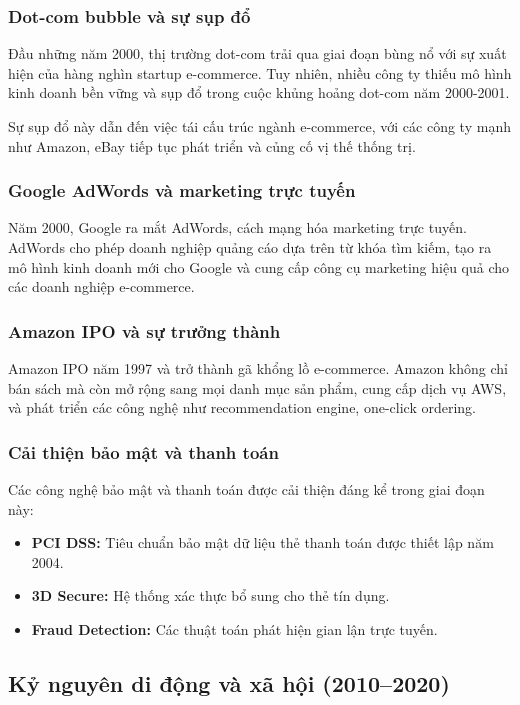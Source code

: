 \documentclass[a4paper,12pt]{report}
\begin{document}
\subsubsection{Dot-com bubble và sự sụp đổ}
Đầu những năm 2000, thị trường dot-com trải qua giai đoạn bùng nổ với sự xuất hiện của hàng nghìn startup e-commerce. Tuy nhiên, nhiều công ty thiếu mô hình kinh doanh bền vững và sụp đổ trong cuộc khủng hoảng dot-com năm 2000-2001.

Sự sụp đổ này dẫn đến việc tái cấu trúc ngành e-commerce, với các công ty mạnh như Amazon, eBay tiếp tục phát triển và củng cố vị thế thống trị.

\subsubsection{Google AdWords và marketing trực tuyến}
Năm 2000, Google ra mắt AdWords, cách mạng hóa marketing trực tuyến. AdWords cho phép doanh nghiệp quảng cáo dựa trên từ khóa tìm kiếm, tạo ra mô hình kinh doanh mới cho Google và cung cấp công cụ marketing hiệu quả cho các doanh nghiệp e-commerce.

\subsubsection{Amazon IPO và sự trưởng thành}
Amazon IPO năm 1997 và trở thành gã khổng lồ e-commerce. Amazon không chỉ bán sách mà còn mở rộng sang mọi danh mục sản phẩm, cung cấp dịch vụ AWS, và phát triển các công nghệ như recommendation engine, one-click ordering.

\subsubsection{Cải thiện bảo mật và thanh toán}
Các công nghệ bảo mật và thanh toán được cải thiện đáng kể trong giai đoạn này:
\begin{itemize}
    \item \textbf{PCI DSS:} Tiêu chuẩn bảo mật dữ liệu thẻ thanh toán được thiết lập năm 2004.
    \item \textbf{3D Secure:} Hệ thống xác thực bổ sung cho thẻ tín dụng.
    \item \textbf{Fraud Detection:} Các thuật toán phát hiện gian lận trực tuyến.
\end{itemize}

\subsection{Kỷ nguyên di động và xã hội (2010--2020)}
\end{document}
